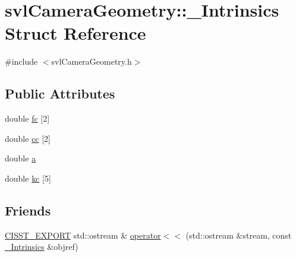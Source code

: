 \hypertarget{structsvl_camera_geometry_1_1___intrinsics}{\section{svl\-Camera\-Geometry\-:\-:\-\_\-\-Intrinsics Struct Reference}
\label{structsvl_camera_geometry_1_1___intrinsics}
}


{\ttfamily \#include $<$svl\-Camera\-Geometry.\-h$>$}

\subsection*{Public Attributes}
\begin{DoxyCompactItemize}
\item 
double \hyperlink{structsvl_camera_geometry_1_1___intrinsics_a2f1e1affb6703fb2de4ab27422945147}{fc} \mbox{[}2\mbox{]}
\item 
double \hyperlink{structsvl_camera_geometry_1_1___intrinsics_a5bc8870b1606f4d5c9da2ee4ada62e0d}{cc} \mbox{[}2\mbox{]}
\item 
double \hyperlink{structsvl_camera_geometry_1_1___intrinsics_a5be499added3f5b792cf599759314df1}{a}
\item 
double \hyperlink{structsvl_camera_geometry_1_1___intrinsics_ac898a7e5d9a1062d6073288b38e91492}{kc} \mbox{[}5\mbox{]}
\end{DoxyCompactItemize}
\subsection*{Friends}
\begin{DoxyCompactItemize}
\item 
\hyperlink{cmn_export_macros_8h_a99393e0c3ac434b2605235bbe20684f8}{C\-I\-S\-S\-T\-\_\-\-E\-X\-P\-O\-R\-T} std\-::ostream \& \hyperlink{structsvl_camera_geometry_1_1___intrinsics_ae98709c28a24803b20961ac4e8cad0ee}{operator$<$$<$} (std\-::ostream \&stream, const \hyperlink{structsvl_camera_geometry_1_1___intrinsics}{\-\_\-\-Intrinsics} \&objref)
\end{DoxyCompactItemize}


